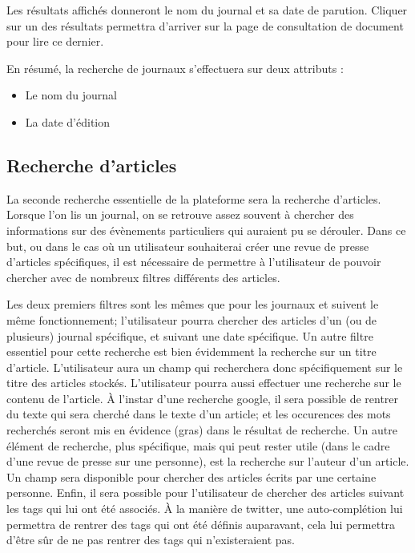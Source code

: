 Les résultats affichés donneront le nom du journal et sa date de parution. Cliquer sur un des résultats permettra d'arriver sur la page de consultation de document pour lire ce dernier.

En résumé, la recherche de journaux s'effectuera sur deux attributs :
\begin{itemize}
	\item Le nom du journal
	\item La date d'édition
\end{itemize}

\subsection{Recherche d'articles}
\label{sec:recherche_article}

La seconde recherche essentielle de la plateforme sera la recherche d'articles. Lorsque l'on lis un journal, on se retrouve assez souvent à chercher des informations sur des évènements particuliers qui auraient pu se dérouler. Dans ce but, ou dans le cas où un utilisateur souhaiterai créer une revue de presse d'articles spécifiques, il est nécessaire de permettre à l'utilisateur de pouvoir chercher avec de nombreux filtres différents des articles.

Les deux premiers filtres sont les mêmes que pour les journaux et suivent le même fonctionnement; l'utilisateur pourra chercher des articles d'un (ou de plusieurs) journal spécifique, et suivant une date spécifique. Un autre filtre essentiel pour cette recherche est bien évidemment la recherche sur un titre d'article. L'utilisateur aura un champ qui recherchera donc spécifiquement sur le titre des articles stockés. L'utilisateur pourra aussi effectuer une recherche sur le contenu de l'article. À l'instar d'une recherche google, il sera possible de rentrer du texte qui sera cherché dans le texte d'un article; et les occurences des mots recherchés seront mis en évidence (gras) dans le résultat de recherche. Un autre élément de recherche, plus spécifique, mais qui peut rester utile (dans le cadre d'une revue de presse sur une personne), est la recherche sur l'auteur d'un article. Un champ sera disponible pour chercher des articles écrits par une certaine personne. Enfin, il sera possible pour l'utilisateur de chercher des articles suivant les tags qui lui ont été associés. À la manière de twitter, une auto-complétion lui permettra de rentrer des tags qui ont été définis auparavant, cela lui permettra d'être sûr de ne pas rentrer des tags qui n'existeraient pas.

